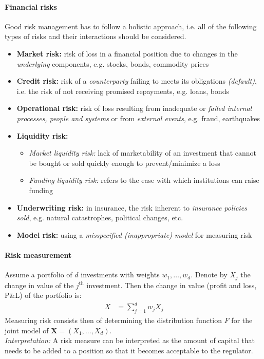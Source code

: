 \documentclass[a4paper,landscape,8pt,fleqn]{scrartcl}
\renewcommand{\emph}[1]{\textbf{#1}}
\begin{document}
\begin{multicols*}{3}
\paragraph{Financial risks}
Good risk management has to follow a holistic approach, i.e. all of the following types of risks and their interactions should be considered.
\begin{itemize}
\item \emph{Market risk:} risk of loss in a financial position due to changes in the \textit{underlying} components, e.g. stocks, bonds, commodity prices
\item \emph{Credit risk:} risk of a \textit{counterparty} failing to meets its obligations \textit{(default)}, i.e. the risk of not receiving promised repayments, e.g. loans, bonds
\item \emph{Operational risk:} risk of loss resulting from inadequate or \textit{failed internal processes, people and systems} or from \textit{external events}, e.g. fraud, earthquakes
\item \emph{ Liquidity risk:}
\begin{itemize}
\item \textit{Market liquidity risk:} lack of marketability of an investment that cannot be bought or sold quickly enough to prevent/minimize a loss
\item \textit{Funding liquidity risk:} refers to the ease with which institutions can raise funding
\end{itemize}
\item \emph{Underwriting risk:} in insurance, the risk inherent to \textit{insurance policies sold}, e.g. natural catastrophes, political changes, etc.
\item \emph{Model risk:} using a \textit{misspecified (inappropriate)  model} for measuring risk
\end{itemize}

\paragraph{Risk measurement}
Assume a portfolio of $d$ investments with weights $w_1,\ldots,w_d$. Denote by $X_j$ the change in value of the $j^\text{th}$ investment. Then the change in value (profit and loss, P\&L) of the portfolio is:
\begin{align*}
X &= \sum_{j=1}^d w_j X_j
\end{align*}
Measuring risk consists then of determining the distribution function $F$ for the joint model of $\bm X = (X_1,\ldots,X_d)$. \\
\textit{Interpretation:} A risk measure can be interpreted as the amount of capital that needs to be added to a position so that it becomes acceptable to the regulator.


\end{multicols*}
\end{document}
